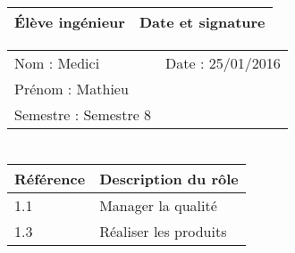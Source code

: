 \documentclass[11pt]{article}
\begin{document}

\begin{center}
\begin{table}[!hp]

	\begin{tabularx}{\linewidth}{|X|X|}
	\hline
	\rowcolor{gray!40} Élève ingénieur & Date et signature \\
	\hline
	\end{tabularx}
	\begin{tabularx}{\linewidth}{|X|X|}
	Nom : Medici & Date : 25/01/2016 \\ 
	Prénom : Mathieu & \\
	Semestre : Semestre 8 & \\
	\hline
	\end{tabularx}
\end{table}
\end{center}

\section*{\large\FR}

\centering
	\begin{longtable}{|p{4cm}|p{4cm}|}
	\hline
	\rowcolor{gray!40} Référence \WBSCourt & Description du rôle \\
	\hline
	 1.1 & Manager la qualité \\
	\hline
	 1.3 & Réaliser les produits \\
	 \hline
	\end{longtable}


\section*{\large\FC}
\end{document}
